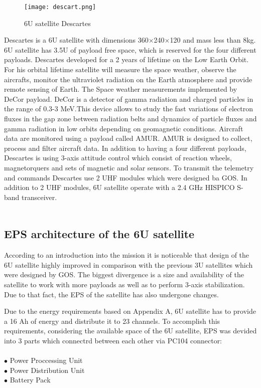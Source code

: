 \begin{figure}[h]
	\centering
	\texttt{[image: descart.png]}
	\caption{6U satellite Descartes}
	\label{fig: EPS}
\end{figure}


  Descartes is a 6U satellite with dimensions 360$\times$240$\times$120 and mass less than 8kg. 6U satellite has 3.5U of payload free space, which is reserved for the four different payloads. Descartes developed for a 2 years of lifetime on the Low Earth Orbit. For his orbital lifetime satellite will measure the space weather, observe the aircrafts, monitor the ultraviolet radiation on the Earth atmosphere  and provide remote sensing of Earth. The Space weather measurements implemented by DeCor payload. DeCor is a detector of gamma radiation and charged particles in the range of 0.3-3 MeV.This device allows to study the fast variations of electron fluxes in the gap zone between radiation belts and dynamics of particle fluxes and gamma radiation in low orbits depending on geomagnetic conditions. Aircraft data are monitored using a payload called AMUR. AMUR is designed to collect, process and filter aircraft data. 
  In addition to having a four different payloads, Descartes is using 3-axis attitude control which consist of reaction wheels, magnetorquers and sets of magnetic and solar sensors. To transmit the telemetry and commands Descartes use 2 UHF modules which were designed ba GOS. In addition to 2 UHF modules, 6U satellite operate with a 2.4 GHz HISPICO S-band transceiver.\\ \\
 
  \subsection{EPS architecture of the 6U satellite}
  According to an introduction into the mission it is noticeable that design of the 6U satellite highly improved in comparison with the previous 3U satellites which were designed by GOS. The biggest divergence is a size and availability of the satellite to work with more payloads as well as to perform 3-axis stabilization. Due to that fact, the EPS of the satellite has also undergone changes.
  
  Due to the energy requirements based on Appendix A, 6U satellite has to provide a 16 Ah of energy and  distribute it to 23 channels. To accomplish this requirements, considering the available space of the 6U satellite, EPS was devided into 3 parts which connectrd between each other via PC104 connector:\\ \\
  $\bullet$ Power Proccessing Unit\\
  $\bullet$ Power Distribution Unit\\
  $\bullet$ Battery Pack\\
  

